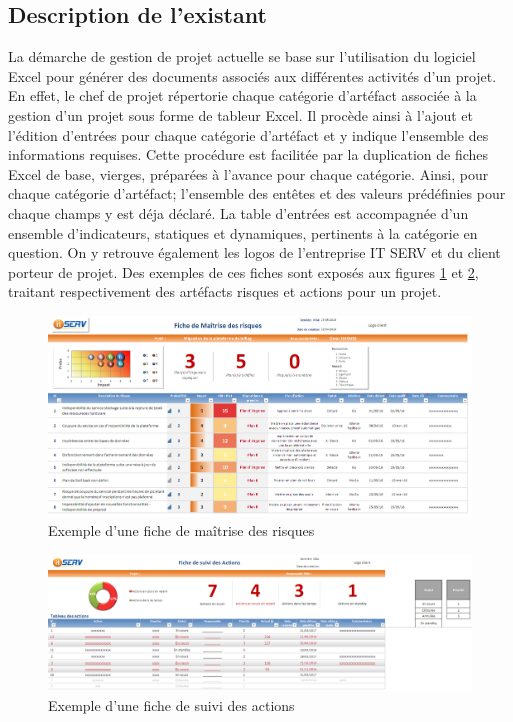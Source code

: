 \begin{spacing}{1.5}
\subsection{Description de l'existant}
La démarche de gestion de projet actuelle se base sur l'utilisation du logiciel Excel pour générer des documents associés aux différentes activités d'un projet. En effet, le chef de projet répertorie chaque catégorie d'artéfact associée à la gestion d'un projet sous forme de tableur Excel. Il procède ainsi à l'ajout et l'édition d'entrées pour chaque catégorie d'artéfact et y indique l'ensemble des informations requises. Cette procédure est facilitée par la duplication de fiches Excel de base, vierges, préparées à l'avance pour chaque catégorie. Ainsi, pour chaque catégorie d'artéfact; l'ensemble des entêtes et des valeurs prédéfinies pour chaque champs y est déja déclaré. La table d'entrées est accompagnée d'un ensemble d'indicateurs, statiques et dynamiques, pertinents à la catégorie en question. On y retrouve également les logos de l'entreprise IT SERV et du client porteur de projet. Des exemples de ces fiches sont exposés aux figures \ref{fig:risqueFiche} et \ref{fig:actionFiche}, traitant respectivement des artéfacts risques et actions pour un projet.

\begin{figure}[H]
\centering
\includegraphics[width=\linewidth]{ficheRisques.png}
\caption{Exemple d'une fiche de maîtrise des risques}
\label{fig:risqueFiche}
\end{figure}

\begin{figure}[H]
\centering
\includegraphics[width=\linewidth]{ficheActions.png}
\caption{Exemple d'une fiche de suivi des actions}
\label{fig:actionFiche}
\end{figure}
\


\end{spacing}
